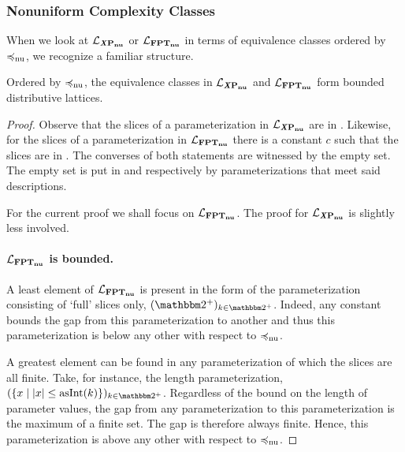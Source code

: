 \subsubsection{Nonuniform Complexity Classes}
When we look at $\mathcal{L}_{\textnormal{\textbf{\textit{X}P$_\textbf{nu}$}}}$ or $\mathcal{L}_{\textnormal{\textbf{FPT$_\textbf{nu}$}}}$ in terms of equivalence classes ordered by $\preccurlyeq_\mathrm{nu}$, we recognize a familiar \parencite{davey2002introduction} structure.
\begin{theorem}
\label{thm:nulattice}
  Ordered by $\preccurlyeq_\mathrm{nu}$, the equivalence classes in $\mathcal{L}_{\textnormal{\textbf{\textit{X}P$_\textbf{nu}$}}}$ and $\mathcal{L}_{\textnormal{\textbf{FPT$_\textbf{nu}$}}}$ form bounded distributive lattices.
\end{theorem}
\begin{proof}
  Observe that the slices of a parameterization in $\mathcal{L}_{\textnormal{\textbf{\textit{X}P$_\textbf{nu}$}}}$ are in .
  Likewise, for the slices of a parameterization in $\mathcal{L}_{\textnormal{\textbf{FPT$_\textbf{nu}$}}}$ there is a constant $c$ such that the slices are in .
  The converses of both statements are witnessed by the empty set.
  The empty set is put in  and  respectively by parameterizations that meet said descriptions.

  For the current proof we shall focus on $\mathcal{L}_{\textnormal{\textbf{FPT$_\textbf{nu}$}}}$.
  The proof for $\mathcal{L}_{\textnormal{\textbf{\textit{X}P$_\textbf{nu}$}}}$ is slightly less involved.

  \paragraph{$\mathcal{L}_{\textnormal{\textbf{FPT$_\textbf{nu}$}}}$ is bounded.}
  A least element of $\mathcal{L}_{\textnormal{\textbf{FPT$_\textbf{nu}$}}}$ is present in the form of the parameterization consisting of `full' slices only, $(\binary^+)_{k \in \binary^+}$.
  Indeed, any constant bounds the gap from this parameterization to another and thus this parameterization is below any other with respect to $\preccurlyeq_\mathrm{nu}$.

  A greatest element can be found in any parameterization of which the slices are all finite.
  Take, for instance, the length parameterization, $(\{x \st \length{x} \le \asNat(k)\})_{k \in \binary^+}$.
  Regardless of the bound on the length of parameter values, the gap from any parameterization to this parameterization is the maximum of a finite set.
  The gap is therefore always finite.
  Hence, this parameterization is above any other with respect to $\preccurlyeq_\mathrm{nu}$.


\end{proof}
